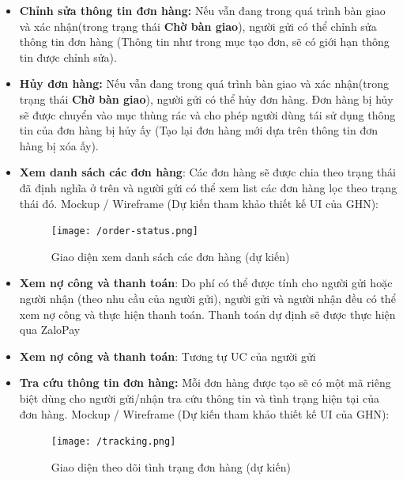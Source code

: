\begin{itemize}
\begin{itemize}
		\item \textbf{Chỉnh sửa thông tin đơn hàng:} Nếu vẫn đang trong quá trình bàn giao và xác nhận(trong trạng thái \textbf{Chờ bàn giao}), người gửi có thể chỉnh sửa thông tin đơn hàng (Thông tin như trong mục tạo đơn, sẽ có giới hạn thông tin được chỉnh sửa).
		
		\item \textbf{Hủy đơn hàng:} Nếu vẫn đang trong quá trình bàn giao và xác nhận(trong trạng thái \textbf{Chờ bàn giao}), người gửi có thể hủy đơn hàng. Đơn hàng bị hủy sẽ được chuyển vào mục thùng rác và cho phép người dùng tái sử dụng thông tin của đơn hàng bị hủy ấy (Tạo lại đơn hàng mới dựa trên thông tin đơn hàng bị xóa ấy).
		
		\item \textbf{Xem danh sách các đơn hàng}: Các đơn hàng sẽ được chia theo trạng thái đã định nghĩa ở trên và người gửi có thể xem list các đơn hàng lọc theo trạng thái đó. Mockup / Wireframe (Dự kiến tham khảo thiết kế UI của GHN):
		
		\begin{figure}[!ht]
			\texttt{[image: /order-status.png]}
			\centering
			\linebreak
			\caption{Giao diện xem danh sách các đơn hàng (dự kiến)}
		\end{figure}
		
		\item \textbf{Xem nợ công và thanh toán}: Do phí có thể được tính cho người gửi hoặc người nhận (theo nhu cầu của người gửi), người gửi và người nhận đều có thể xem nợ công và thực hiện thanh toán. Thanh toán dự định sẽ được thực hiện qua ZaloPay
	\end{itemize}
	
	\begin{itemize}
		\item \textbf{Xem nợ công và thanh toán}: Tương tự UC của người gửi
		
		\item \textbf{Tra cứu thông tin đơn hàng:} Mỗi đơn hàng được tạo sẽ có một mã riêng biệt dùng cho người gửi/nhận tra cứu thông tin và tình trạng hiện tại của đơn hàng. Mockup / Wireframe (Dự kiến tham khảo thiết kế UI của GHN): 
		
		\begin{figure}[!ht]
			\texttt{[image: /tracking.png]}
			\centering
			\linebreak
			\caption{Giao diện theo dõi tình trạng đơn hàng (dự kiến)}
		\end{figure}
		

\end{itemize}
\end{itemize}
